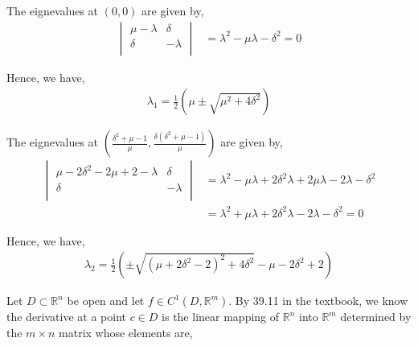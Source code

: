\documentclass[12pt]{article}
\newenvironment{problem}[2][Problem]{\begin{trivlist}
\item[\hskip \labelsep {\bfseries #1}\hskip \labelsep {\bfseries #2.}]}{\end{trivlist}}
\begin{document}
The eignevalues at $(0, 0)$ are given by,
\begin{align*}
\begin{vmatrix} 
\mu - \lambda & \delta\\
\delta & -\lambda\\
\end{vmatrix} &= \lambda^2 - \mu \lambda - \delta^2 = 0
\end{align*}

Hence, we have,
\begin{align*}
\lambda_1 = \frac{1}{2}\left(\mu \pm \sqrt{\mu^2 + 4\delta^2}\right)
\end{align*}

The eignevalues at $(\frac{\delta^2 + \mu - 1}{\mu}, \frac{\delta(\delta^2 + \mu - 1)}{\mu})$ are given by,
\begin{align*}
\begin{vmatrix} 
\mu - 2\delta^2 - 2\mu + 2 - \lambda & \delta\\
\delta & -\lambda\\
\end{vmatrix} &= \lambda^2 - \mu \lambda + 2\delta^2 \lambda + 2\mu \lambda -2\lambda - \delta^2\\
&= \lambda^2 + \mu \lambda + 2\delta^2 \lambda - 2\lambda - \delta^2 = 0
\end{align*}

Hence, we have,
\begin{align*}
\lambda_2 = \frac{1}{2}\left(\pm \sqrt{(\mu + 2\delta^2 - 2)^2 + 4\delta^2} - \mu - 2\delta^2 + 2\right)
\end{align*}



\begin{problem}{3}
\end{problem}

Let $D \subset \mathbb{R}^n$ be open and let $f \in C^1(D, \mathbb{R}^m)$. By 39.11 in the textbook, we know the derivative at a point $c \in D$ is the linear mapping of $\mathbb{R}^n$ into $\mathbb{R}^m$ determined by the $m \times n$ matrix whose elements are,
\end{document}
